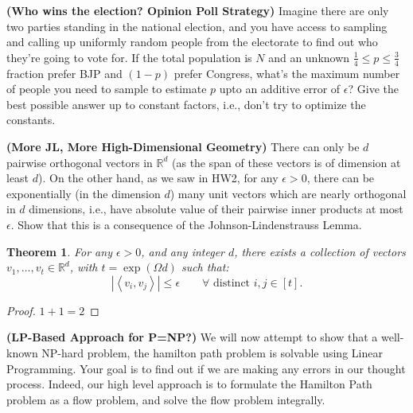 \documentclass[solution,addpoints,12pt]{exam}
\newtheorem{theorem}{Theorem}
\newcommand{\card}[1]{\left\lvert #1 \right\rvert}
\def\abs{\card}
\newcommand{\reals}{\mathbb{R}}
\newcommand{\iprod}[1]{\left\langle #1 \right\rangle}
\begin{document}
\begin{questions}

\question[10] \textbf{(Who wins the election? Opinion Poll Strategy)} Imagine there are only two parties standing in the national election, and you have access to sampling and calling up uniformly random people from the electorate to find out who they're going to vote for. If the total population is $N$ and an unknown $\frac14 \leq p \leq \frac34$ fraction prefer BJP and $(1-p)$ prefer Congress, what's the maximum number of people you need to sample to estimate $p$ upto an additive error of $\epsilon$? Give the best possible answer up to constant factors, i.e., don't try to optimize the constants.

\question[10]  \textbf{(More JL, More High-Dimensional Geometry)} There can only be $d$ pairwise orthogonal vectors in $\reals^d$ (as the span of these vectors is of dimension at least $d$).  On the other hand, as we saw in HW2, for any $\epsilon > 0$, there can be exponentially (in the dimension $d$) many unit vectors which are nearly orthogonal in $d$ dimensions, i.e., have absolute value of their pairwise inner products at most $\epsilon$.  Show that this is a consequence of the Johnson-Lindenstrauss Lemma.

\begin{theorem}  For any $\epsilon > 0$, and any integer $d$, there exists a collection of vectors $v_1, \ldots, v_t \in \reals^d$, with $t = \exp(\Omega{d})$ such that:
  \[ \abs{\iprod{v_i, v_j}} \le \epsilon \qquad \forall \text{ distinct } i,j \in [t]. \]
\end{theorem}

\begin{solution}
\begin{proof}
  $ 1 + 1 = 2 $
\end{proof}
\end{solution}


\question[10] \textbf{(LP-Based Approach for P=NP?)} We will now attempt to show that a well-known NP-hard problem, the hamilton path problem is solvable using Linear Programming. Your goal is to find out if we are making any errors in our thought process. Indeed, our high level approach is to formulate the Hamilton Path problem as a flow problem, and solve the flow problem integrally.

\end{questions}
\end{document}
